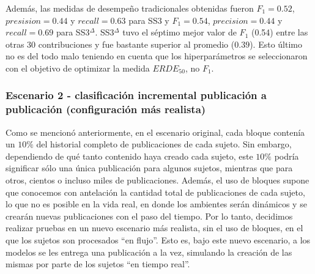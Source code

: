 Además, las medidas de desempeño tradicionales obtenidas fueron $F_1=0.52$, $presision=0.44$ y $recall=0.63$ para SS3 y $F_1=0.54$, $precision=0.44$ y $recall=0.69$ para SS3$^\Delta$. SS3$^\Delta$ tuvo el séptimo mejor valor de $F_1$ (0.54) entre las otras 30 contribuciones y fue bastante superior al promedio ($0.39$). Esto último no es del todo malo teniendo en cuenta que los hiperparámetros se seleccionaron con el objetivo de optimizar la medida $ERDE_{50}$, no $F_1$.


\subsubsection{Escenario 2 - clasificación incremental publicación a publicación (configuración más realista)} \label{subsec:exp-scenario2} 


Como se mencionó anteriormente, en el escenario original, cada bloque contenía un $10\%$ del historial completo de publicaciones de cada sujeto. Sin embargo, dependiendo de qué tanto contenido haya creado cada sujeto, este $10\%$ podría significar sólo una única publicación para algunos sujetos, mientras que para otros, cientos o incluso miles de publicaciones. Además, el uso de bloques supone que conocemos con antelación la cantidad total de publicaciones de cada sujeto, lo que no es posible en la vida real, en donde los ambientes serán dinámicos y se crearán nuevas publicaciones con el paso del tiempo. Por lo tanto, decidimos realizar pruebas en un nuevo escenario más realista, sin el uso de bloques, en el que los sujetos son procesados ``en flujo''. Esto es, bajo este nuevo escenario, a los modelos se les entrega una publicación a la vez, simulando la creación de las mismas por parte de los sujetos ``en tiempo real''.

